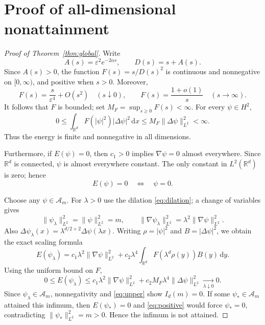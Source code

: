 \documentclass[11pt]{article}
\newcommand{\R}{\mathbb{R}}
\newcommand{\A}{\mathcal{A}}
\newcommand{\dd}{\,\mathrm{d}}
\begin{document}
\section{Proof of all-dimensional nonattainment}
\begin{proof}[Proof of Theorem~\ref{thm:global}]
Write
\begin{equation*}
 A(s)=\varepsilon^2e^{-2\alpha s},\qquad D(s)=s+A(s).
\end{equation*}
Since $A(s)>0$, the function $F(s)=s/D(s)^2$ is continuous
and nonnegative on $[0,\infty)$, and positive when $s>0$.
Moreover,
\begin{equation}\label{eq:asymptotics}
 F(s)=\frac{s}{\varepsilon^4}+O(s^2)\quad(s\downarrow0),
 \qquad F(s)=\frac{1+o(1)}{s}\quad(s\to\infty).
\end{equation}
It follows that $F$ is bounded; set
$M_F=\sup_{s\ge0}F(s)<\infty$.
For every $\psi\in H^2$,
\begin{equation}\label{eq:bound}
 0\le \int_{\R^d}F(|\psi|^2)|\Delta\psi|^2\dd x
 \le M_F\|\Delta\psi\|_{L^2}^2<\infty.
\end{equation}
Thus the energy is finite and nonnegative in all dimensions.

Furthermore, if $E(\psi)=0$, then $c_1>0$ implies
$\nabla\psi=0$ almost everywhere. Since $\R^d$ is connected,
$\psi$ is almost everywhere constant. The only constant in
$L^2(\R^d)$ is zero; hence
\begin{equation}\label{eq:positive}
 E(\psi)=0\quad\Longleftrightarrow\quad\psi=0.
\end{equation}

Choose any $\psi\in\A_m$. For $\lambda>0$ use the dilation
\eqref{eq:dilation}; a change of variables gives
\begin{equation}\label{eq:mass_preserved}
 \|\psi_\lambda\|_{L^2}^2=\|\psi\|_{L^2}^2=m,
 \qquad \|\nabla\psi_\lambda\|_{L^2}^2
 =\lambda^2\|\nabla\psi\|_{L^2}^2.
\end{equation}
Also $\Delta\psi_\lambda(x)=\lambda^{d/2+2}\Delta\psi(\lambda x)$.
Writing $\rho=|\psi|^2$ and $B=|\Delta\psi|^2$, we obtain the
exact scaling formula
\begin{equation}\label{eq:scale}
 E(\psi_\lambda)
 =c_1\lambda^2\|\nabla\psi\|_{L^2}^2
 +c_2\lambda^4\int_{\R^d}F(\lambda^d\rho(y))B(y)\dd y.
\end{equation}
Using the uniform bound on $F$,
\begin{equation}\label{eq:upper}
 0\le E(\psi_\lambda)
 \le c_1\lambda^2\|\nabla\psi\|_{L^2}^2
 +c_2 M_F\lambda^4\|\Delta\psi\|_{L^2}^2
 \xrightarrow[\lambda\downarrow0]{}0.
\end{equation}
Since $\psi_\lambda\in\A_m$, nonnegativity and
\eqref{eq:upper} show $I_d(m)=0$.
If some $\psi_*\in\A_m$ attained this infimum, then
$E(\psi_*)=0$ and \eqref{eq:positive} would force
$\psi_*=0$, contradicting $\|\psi_*\|_{L^2}^2=m>0$.
Hence the infimum is not attained.
\end{proof}
\end{document}
